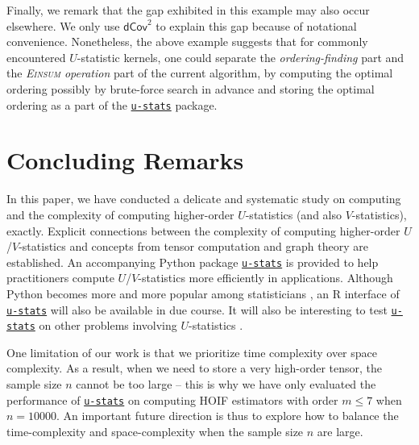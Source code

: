 \documentclass[twoside,11pt]{article}
\newcommand{\Lin}[1]{{\color{purple}{Lin: #1}}}
\def\Einsum{\textsc{Einsum}}
\newcommand{\libref}[2]{\href{#2}{\texttt{#1}}}
\def\package{\libref{u-stats}{https://github.com/zrq1706/U-Statistics-python}}
\begin{document}
\Lin{to add}

Finally, we remark that the gap exhibited in this example may also occur elsewhere. We only use $\mathsf{dCov}^{2}$ to explain this gap because of notational convenience. Nonetheless, the above example suggests that for commonly encountered $U$-statistic kernels, one could separate the \emph{ordering-finding} part and the \emph{\Einsum{} operation} part of the current algorithm, by computing the optimal ordering possibly by brute-force search in advance and storing the optimal ordering as a part of the \package{} package.
\fi

\section{Concluding Remarks}
\label{sec:conclusions}

In this paper, we have conducted a delicate and systematic study on computing and the complexity of computing higher-order $U$-statistics (and also $V$-statistics), exactly. Explicit connections between the complexity of computing higher-order $U$/$V$-statistics and concepts from tensor computation and graph theory are established. An accompanying Python package \package{} is provided to help practitioners compute $U$/$V$-statistics more efficiently in applications. Although Python becomes more and more popular among statisticians \citep{dai2023rehline}, an R interface of \package{} will also be available in due course. It will also be interesting to test \package{} on other problems involving $U$-statistics \citep{qiu2024neural, shen2025engression}. 

One limitation of our work is that we prioritize time complexity over space complexity. As a result, when we need to store a very high-order tensor, the sample size $n$ cannot be too large -- this is why we have only evaluated the performance of \package{} on computing HOIF estimators with order $m \leq 7$ when $n = 10000$. An important future direction is thus to explore how to balance the time-complexity and space-complexity when the sample size $n$ are large.
\end{document}
